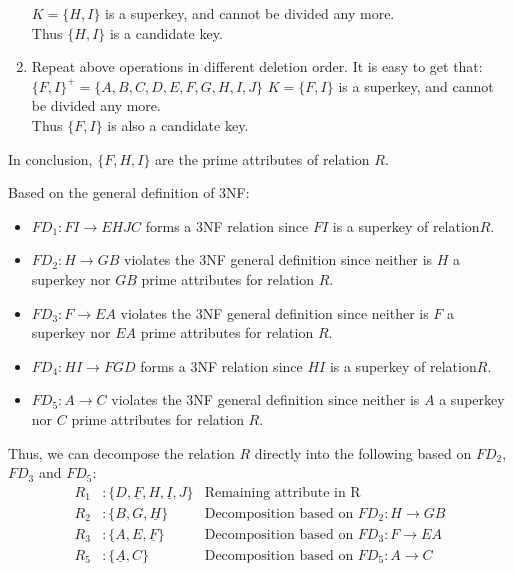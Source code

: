 \documentclass[11pt,letterpaper,titlepage,en-US]{article}
\begin{document}
\begin{homeworkProblem}
\begin{homeworkSubProblem}
\begin{enumerate}[label=\textbf{Step {\arabic*}}, leftmargin=2cm]
                $K = \{H,I\}$ is a superkey, and cannot be divided any more.\\
                Thus $\{H, I\}$ is a candidate key.
            \item Repeat above operations in different deletion order. It is easy to get that:$\{F,I\}^+ = \{A,B,C,D,E,F,G,H,I,J\}$
                $K = \{F,I\}$ is a superkey, and cannot be divided any more.\\
                Thus $\{F, I\}$ is also a candidate key.
        \end{enumerate}
        In conclusion, $\{F, H, I\}$ are the prime attributes of relation $R$.

    \end{homeworkSubProblem}

    \begin{homeworkSubProblem}
        Based on the general definition of 3NF:
        \begin{itemize}
            \item $FD_1: FI \rightarrow EHJC$ forms a 3NF relation since $FI$ is a superkey of relation$R$.
            \item $FD_2: H \rightarrow GB$ violates the 3NF general definition since neither is $H$ a superkey nor $GB$ prime attributes for relation $R$.
            \item $FD_3: F \rightarrow EA$ violates the 3NF general definition since neither is $F$ a superkey nor $EA$ prime attributes for relation $R$.
            \item $FD_4: HI \rightarrow FGD$ forms a 3NF relation since $HI$ is a superkey of relation$R$.
            \item $FD_5: A \rightarrow C$ violates the 3NF general definition since neither is $A$ a superkey nor $C$ prime attributes for relation $R$.
        \end{itemize}

        Thus, we can decompose the relation $R$ directly into the following based on $FD_2$, $FD_3$ and $FD_5$:
        \begin{align*}
            R_1& : \{D, \underline{F}, H, \underline{I}, J\} & \text{Remaining attribute in R}\\
            R_2& : \{B, G, \underline{H}\} & \text{Decomposition based on $FD_2: H \rightarrow GB$}\\
            R_3& : \{A, E, \underline{F}\} & \text{Decomposition based on $FD_3: F \rightarrow EA$}\\
            R_5& : \{\underline{A}, C\} & \text{Decomposition based on $FD_5: A \rightarrow C$}\\
        \end{align*}
    \end{homeworkSubProblem}
\end{homeworkProblem}
\end{document}
